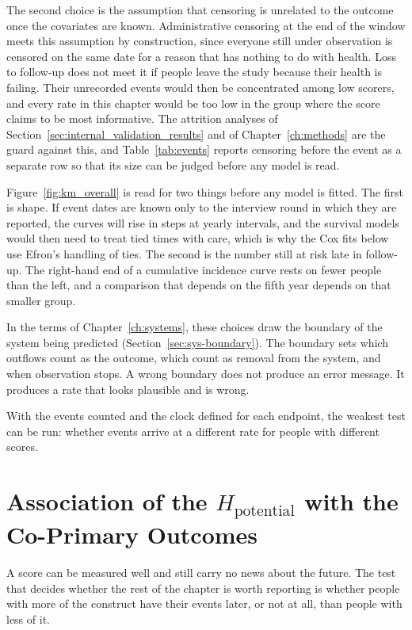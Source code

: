 The second choice is the assumption that censoring is unrelated to the outcome once the covariates are known. Administrative censoring at the end of the window meets this assumption by construction, since everyone still under observation is censored on the same date for a reason that has nothing to do with health. Loss to follow-up does not meet it if people leave the study because their health is failing. Their unrecorded events would then be concentrated among low scorers, and every rate in this chapter would be too low in the group where the score claims to be most informative. The attrition analyses of Section~\ref{sec:internal_validation_results} and of Chapter~\ref{ch:methods} are the guard against this, and Table~\ref{tab:events} reports censoring before the event as a separate row so that its size can be judged before any model is read.

Figure~\ref{fig:km_overall} is read for two things before any model is fitted. The first is shape. If event dates are known only to the interview round in which they are reported, the curves will rise in steps at yearly intervals, and the survival models would then need to treat tied times with care, which is why the Cox fits below use Efron's handling of ties. The second is the number still at risk late in follow-up. The right-hand end of a cumulative incidence curve rests on fewer people than the left, and a comparison that depends on the fifth year depends on that smaller group.

In the terms of Chapter~\ref{ch:systems}, these choices draw the boundary of the system being predicted (Section~\ref{sec:sys-boundary}). The boundary sets which outflows count as the outcome, which count as removal from the system, and when observation stops. A wrong boundary does not produce an error message. It produces a rate that looks plausible and is wrong.

With the events counted and the clock defined for each endpoint, the weakest test can be run: whether events arrive at a different rate for people with different scores.

\section{Association of the $H_{\text{potential}}$ with the Co-Primary Outcomes}
\label{sec:assoc}

\noindent A score can be measured well and still carry no news about the future. The test that decides whether the rest of the chapter is worth reporting is whether people with more of the construct have their events later, or not at all, than people with less of it.

